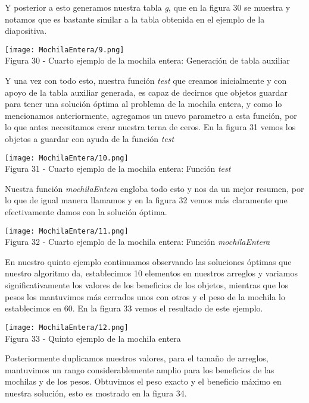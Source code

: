 \documentclass[12pt,twoside]{article}
\begin{document}
Y posterior a esto generamos nuestra tabla \textit{g}, que en la figura 30 se muestra y notamos que es bastante similar a la tabla obtenida en el ejemplo de la diapositiva.
\begin{center}
    \texttt{[image: MochilaEntera/9.png]}\\
    Figura 30 - Cuarto ejemplo de la mochila entera: Generación de tabla auxiliar
\end{center}
Y una vez con todo esto, nuestra función \textit{test} que creamos inicialmente y con apoyo de la tabla auxiliar generada, es capaz de decirnos que objetos guardar para tener una solución óptima al problema de la mochila entera, y como lo mencionamos anteriormente, agregamos un nuevo parametro a esta función, por lo que antes necesitamos crear nuestra terna de ceros. En la figura 31 vemos los objetos a guardar con ayuda de la función \textit{test}
\begin{center}
    \texttt{[image: MochilaEntera/10.png]}\\
    Figura 31 - Cuarto ejemplo de la mochila entera: Función \textit{test}
\end{center}
Nuestra función \textit{mochilaEntera} engloba todo esto y nos da un mejor resumen, por lo que de igual manera llamamos y en la figura 32 vemos más claramente que efectivamente damos con la solución óptima.
\begin{center}
    \texttt{[image: MochilaEntera/11.png]}\\
    Figura 32 - Cuarto ejemplo de la mochila entera: Función \textit{mochilaEntera}
\end{center}
En nuestro quinto ejemplo continuamos observando las soluciones óptimas que nuestro algoritmo da, establecimos 10 elementos en nuestros arreglos y variamos significativamente los valores de los beneficios de los objetos, mientras que los pesos los mantuvimos más cerrados unos con otros y el peso de la mochila lo establecimos en 60. En la figura 33 vemos el resultado de este ejemplo.
\begin{center}
    \texttt{[image: MochilaEntera/12.png]}\\
    Figura 33 - Quinto ejemplo de la mochila entera
\end{center}
Posteriormente duplicamos nuestros valores, para el tamaño de arreglos, mantuvimos un rango considerablemente amplio para los beneficios de las mochilas y de los pesos. Obtuvimos el peso exacto y el beneficio máximo en nuestra solución, esto es mostrado en la figura 34.
\end{document}

